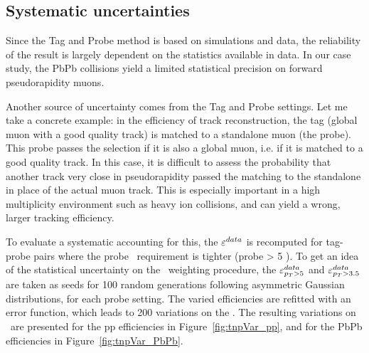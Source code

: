 

\subsection{Systematic uncertainties}
\label{sec:tnp_syst}

Since the Tag and Probe method is based on simulations and data, the
reliability of the result is largely dependent on the statistics
available in data. In our case study, the PbPb collisions yield a
limited statistical precision on forward pseudorapidity muons. 

Another source of uncertainty comes from the Tag and Probe 
settings. Let me take a concrete example: in the efficiency of track
reconstruction, the tag (global muon with a good quality track) is
matched to a standalone muon (the probe). This probe passes the
selection if it is also a global muon, i.e. if it is matched to a good
quality track. In this case, it is difficult to assess the probability
that another track very close in pseudorapidity passed the matching to
the standalone in place of the actual muon track. This is especially
important in a high multiplicity environment such as heavy ion
collisions, and can yield a wrong, larger tracking efficiency. 

To evaluate a systematic accounting for this, the $\varepsilon^{data}$
is recomputed for tag-probe pairs where the probe \pt\ requirement is
tighter (probe \pt > 5 \GeVc). To get an idea of the statistical uncertainty on the \Ctnp\ weighting procedure,
the $\varepsilon^{data}_{p_{T} > 5}$ and $\varepsilon^{data}_{p_{T} > 3.5}$ are taken as seeds for
100 random generations following asymmetric Gaussian
distributions, for each probe \pt setting. The varied efficiencies are refitted with an error
function, which leads to 200 variations on the \Ctnp. The resulting
variations on \Ctnp\ are presented for the pp efficiencies in
Figure~\ref{fig:tnpVar_pp}, and for the PbPb efficiencies in
Figure~\ref{fig:tnpVar_PbPb}.


